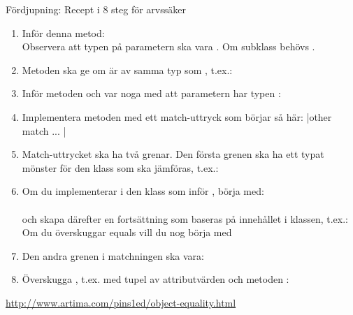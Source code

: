 \begin{Slide}{Fördjupning: Recept i 8 steg för arvssäker }\SlideFontTiny
\setlength{\leftmargini}{0pt}
\begin{enumerate}\SlideFontTiny
\item Inför denna metod: \\Observera att typen på parametern ska vara . Om subklass behövs .

\item Metoden  ska ge  om  är av samma typ som , t.ex.: 

\item Inför metoden  och var noga med att parametern har typen : \\ 

\item Implementera metoden  med ett match-uttryck som börjar så här:
\code|other match { ... } |

\item Match-uttrycket ska ha två grenar. Den första grenen ska ha ett typat mönster för den klass som ska jämföras, t.ex.: \\ 

\item Om du implementerar  i den klass som inför , börja med: \\  \\
och skapa därefter en fortsättning som baseras på innehållet i klassen, t.ex.:  \\
Om du överskuggar equals vill du nog börja med

\item Den andra grenen i matchningen ska vara:

\item Överskugga , t.ex. med tupel av attributvärden och metoden \code{##}: \\

\end{enumerate}
\url{http://www.artima.com/pins1ed/object-equality.html}

\end{Slide}
